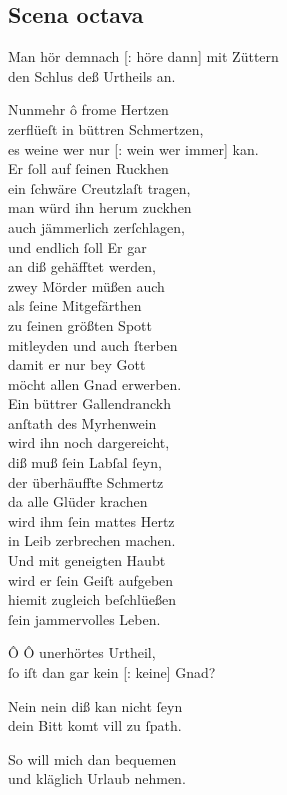 \documentclass{ees}
\newenvironment{lyrics}[1]{%
  \subsection{#1}\nopagebreak%
  \begin{lyricslist}%
  \let\voice\item%
}{%
  \end{lyricslist}%
}
\begin{document}
\begin{lyrics}{Scena octava}
  \voice[Schöpffer]
  Man hör demnach [: höre dann] mit Züttern\\
  den Schlus deß Urtheils an.

  \voice[Gerecht.]
  Nunmehr ô frome Hertzen\\
  zerflüeſt in büttren Schmertzen,\\
  es weine wer nur [: wein wer immer] kan.\\
  Er ſoll auf ſeinen Ruckhen\\
  ein ſchwäre Creutzlaſt tragen,\\
  man würd ihn herum zuckhen\\
  auch jämmerlich zerſchlagen,\\
  und endlich ſoll Er gar\\
  an diß gehäfftet werden,\\
  zwey Mörder müßen auch\\
  als ſeine Mitgefärthen\\
  zu ſeinen größten Spott\\
  mitleyden und auch ſterben\\
  damit er nur bey Gott\\
  möcht allen Gnad erwerben.\\
  Ein büttrer Gallendranckh\\
  anſtath des Myrhenwein\\
  wird ihn noch dargereicht,\\
  diß muß ſein Labſal ſeyn,\\
  der überhäuffte Schmertz\\
  da alle Glüder krachen\\
  wird ihm ſein mattes Hertz\\
  in Leib zerbrechen machen.\\
  Und mit geneigten Haubt\\
  wird er ſein Geiſt aufgeben\\
  hiemit zugleich beſchlüeßen\\
  ſein jammervolles Leben.

  \voice[Barmh.]
  Ô Ô unerhörtes Urtheil,\\
  ſo iſt dan gar kein [: keine] Gnad?

  \voice[Schöpffer]
  Nein nein diß kan nicht ſeyn\\
  dein Bitt komt vill zu ſpath.

  \voice[Barmh.]
  So will mich dan bequemen\\
  und kläglich Urlaub nehmen.
\end{lyrics}
\end{document}
